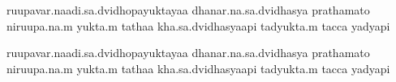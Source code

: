 \documentclass{article}
\begin{document}
\beginnumbering
{}

\pstart
ruupavar.naadi.sa.dvidhopayuktayaa dhanar.na.sa.dvidhasya prathamato
niruupa.na.m yukta.m tathaa kha.sa.dvidhasyaapi tadyukta.m tacca
yadyapi
\pend

\pstart[\section*{s}]
ruupavar.naadi.sa.dvidhopayuktayaa dhanar.na.sa.dvidhasya prathamato
niruupa.na.m yukta.m tathaa kha.sa.dvidhasyaapi tadyukta.m tacca
yadyapi

\pend


\endnumbering
\end{document}
